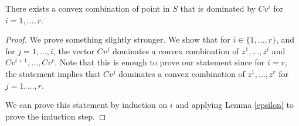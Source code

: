 \documentclass[runningheads]{llncs}
\begin{document}
\begin{lemma}\label{tightcutcomb}
	There exists a convex combination of point in $S$ that is dominated by $Cv^i$ for $i=1,\ldots,r$.
\end{lemma}
\begin{proof}
	
	We prove something slightly stronger. We show that for $i\in\{1,\ldots,r\}$, and for $j=1,\ldots,i$, the vector $Cv^j$ dominates  a convex combination of $z^1,\ldots,z^i$ and $Cv^{i+1},\ldots,Cv^r$. Note that this is enough to prove our statement since for $i=r$, the statement implies that $Cv^j$ dominates a convex combination of $z^1,\ldots,z^r$ for $j=1,\ldots,r$. 
	
	We can prove this statement by induction on $i$ and applying Lemma \ref{epsilon} to prove the induction step.
\end{proof}
\end{document}
